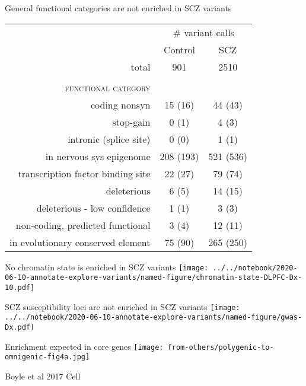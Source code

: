 \documentclass[usenames,dvipsnames]{beamer}
\begin{document}
\begin{frame}{General functional categories are not enriched in SCZ variants}
\small
\begin{tabular}{r|cc}
& \multicolumn{2}{c}{\# variant calls} \\
& Control & SCZ \\
\rowcolor{gray}
total & 901 & 2510 \\
& & \\
\scshape{functional category} & & \\
\rowcolor{SkyBlue}
coding nonsyn & 15 {\tiny (16)} & 44 {\tiny (43)} \\
\rowcolor{Turquoise}
stop-gain & 0 {\tiny (1)} & 4 {\tiny (3)}\\
\rowcolor{SkyBlue}
intronic (splice site) & 0 {\tiny (0)}& 1 {\tiny (1)}\\
\rowcolor{Turquoise}
in nervous sys epigenome & 208 {\tiny (193)}& 521 {\tiny (536)}\\
\rowcolor{SkyBlue}
transcription factor binding site & 22 {\tiny (27)}& 79 {\tiny (74)}\\
\rowcolor{Turquoise}
deleterious & 6 {\tiny (5)}& 14 {\tiny (15)}\\
\rowcolor{SkyBlue}
deleterious - low confidence & 1 {\tiny (1)}& 3 {\tiny (3)}\\
\rowcolor{Turquoise}
non-coding, predicted functional & 3 {\tiny (4)}& 12 {\tiny (11)}\\
\rowcolor{SkyBlue}
in evolutionary conserved element & 75 {\tiny (90)}& 265 {\tiny (250)}\\
\end{tabular}
\end{frame}


\begin{frame}{No chromatin state is enriched in SCZ variants}
\texttt{[image: ../../notebook/2020-06-10-annotate-explore-variants/named-figure/chromatin-state-DLPFC-Dx-10.pdf]}
\end{frame}

\begin{frame}{SCZ susceptibility loci are not enriched in SCZ variants}
\texttt{[image: ../../notebook/2020-06-10-annotate-explore-variants/named-figure/gwas-Dx.pdf]}
\end{frame}

\begin{frame}{Enrichment expected in core genes}
\texttt{[image: from-others/polygenic-to-omnigenic-fig4a.jpg]}

{\tiny Boyle et al 2017 Cell}
\end{frame}
\end{document}
